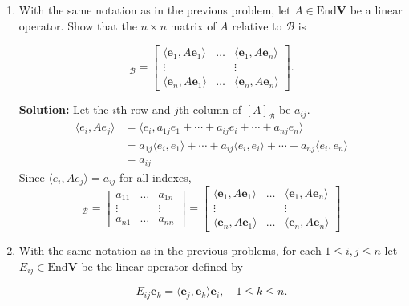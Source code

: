 \documentclass{report}
\newcommand{\solution}{\textbf{Solution: }}
\newcommand{\inner}[2]{\langle #1, #2 \rangle}
\begin{document}
\begin{enumerate}
	\medskip	
	\item
	With the same notation as in the previous problem, let $A \in \mathrm{End} \mathbf{V}$ be 
	a linear operator. Show that the $n \times n$ matrix of $A$ relative to $\mathcal{B}$ is 
	
		\begin{equation*}
			[A]_\mathcal{B} = \begin{bmatrix}
			\langle \mathbf{e}_1,A\mathbf{e}_1 \rangle & \dots & \langle \mathbf{e}_1,A\mathbf{e}_n \rangle \\
			\vdots & {} & \vdots \\
			\langle \mathbf{e}_n,A\mathbf{e}_1 \rangle & \dots & \langle \mathbf{e}_n,A\mathbf{e}_n \rangle
			\end{bmatrix}.
		\end{equation*}
	
	\solution 
	Let the $i$th row and $j$th column of $[A]_\mathcal{B}$ be $a_{ij}$.
	\begin{align*}
		\inner{e_i}{Ae_j} 
		&= \inner{e_i}{a_{1j}e_1 + \cdots + a_{ij}e_i + \cdots + a_{nj}e_n} \\
		&= a_{1j}\inner{e_i}{e_1} + \cdots + a_{ij}\inner{e_i}{e_i} + \cdots + a_{nj}\inner{e_i}{e_n} \\
		&= a_{ij}
	\end{align*}
	Since $\inner{e_i}{Ae_j} = a_{ij}$ for all indexes, 
	\begin{equation*}
		[A]_\mathcal{B} = 
		\begin{bmatrix}
			a_{11} & \dots & a_{1n} \\
			\vdots & {} & \vdots \\
			a_{n1} & \dots & a_{nn}
		\end{bmatrix} =
		\begin{bmatrix}
			\langle \mathbf{e}_1,A\mathbf{e}_1 \rangle & \dots & \langle \mathbf{e}_1,A\mathbf{e}_n \rangle \\
			\vdots & {} & \vdots \\
			\langle \mathbf{e}_n,A\mathbf{e}_1 \rangle & \dots & \langle \mathbf{e}_n,A\mathbf{e}_n \rangle
		\end{bmatrix}
	\end{equation*}

	\medskip
	\item
	With the same notation as in the previous problems, for each $1 \leq i,j \leq n$ let $E_{ij} \in \mathrm{End}\mathbf{V}$ 
	be the linear operator defined by 
	
		\begin{equation*}
			E_{ij} \mathbf{e}_k = \langle \mathbf{e}_j,\mathbf{e}_k \rangle \mathbf{e}_i, \quad 1 \leq k \leq n.
		\end{equation*}
			

\end{enumerate}
\end{document}
